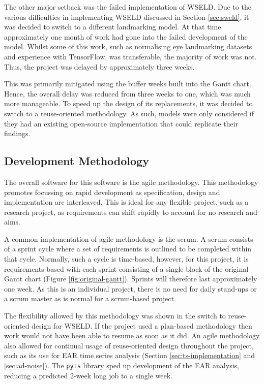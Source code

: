 The other major setback was the failed implementation of WSELD. Due to the various difficulties in implementing WSELD discussed in Section \ref{sec:sweld}, it was decided to switch to a different landmarking model. At that time approximately one month of work had gone into the failed development of the model. Whilst some of this work, such as normalising eye landmarking datasets and experience with TensorFlow, was transferable, the majority of work was not. Thus, the project was delayed by approximately three weeks. 

This was primarily mitigated using the buffer weeks built into the Gantt chart. Hence, the overall delay was reduced from three weeks to one, which was much more manageable. To speed up the design of its replacements, it was decided to switch to a reuse-oriented methodology. As such, models were only considered if they had an existing open-source implementation that could replicate their findings.

\subsection{Development Methodology}

The overall software for this software is the agile methodology\cite{beck2001manifesto}. This methodology promotes focussing on rapid development as specification, design and implementation are
interleaved\cite{archbold2023software}. This is ideal for any flexible project, such as a research project, as requirements can shift rapidly to account for no research and aims. 

A common implementation of agile methodology is the scrum. A scrum consists of a sprint cycle where a set of requirements is outlined to be completed within that cycle. Normally, such a cycle is time-based, however, for this project, it is requirements-based with each sprint consisting of a single block of the original Gantt chart (Figure \ref{fig:original-gantt}). Sprints will therefore last approximately one week. As this is an individual project, there is no need for daily stand-ups or a scrum master as is normal for a scrum-based project.

The flexibility allowed by this methodology was shown in the switch to reuse-oriented design for WSELD. If the project used a plan-based methodology then work would not have been able to resume as soon as it did. An agile methodology also allowed for continual usage of reuse-oriented design throughout the project, such as its use for EAR time series analysis (Section \ref{sec:ts-implementation} and \ref{sec:ad-noise}). The \verb|pyts| library sped up development of the EAR analysis, reducing a predicted 2-week long job to a single week. 

